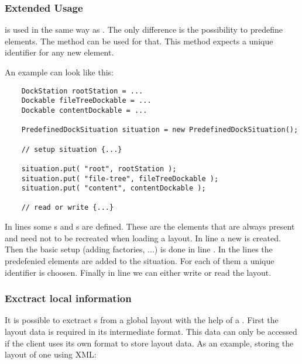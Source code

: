 
\subsubsection{Extended Usage}
 is used in the same way as . The only difference is the possibility to predefine elements. The method  can be used for that. This method expects a unique identifier for any new element.

An example can look like this:
\begin{lstlisting}
	DockStation rootStation = ...
	Dockable fileTreeDockable = ...
	Dockable contentDockable = ...

	PredefinedDockSituation situation = new PredefinedDockSituation();

	// setup situation {...}

	situation.put( "root", rootStation );
	situation.put( "file-tree", fileTreeDockable );
	situation.put( "content", contentDockable );

	// read or write {...}
\end{lstlisting}
In lines  some s and s are defined. These are the elements that are always present and need not to be recreated when loading a layout. In line  a new  is created. Then the basic setup (adding factories, ...) is done in line . In the lines  the predefenied elements are added to the situation. For each of them a unique identifier is choosen. Finally in line  we can either write or read the layout.


\subsubsection{Exctract local information}
It is possible to exctract s from a global layout with the help of a . First the layout data is required in its intermediate format. This data can only be accessed if the client uses its own format to store layout data. As an example, storing the layout of one  using XML:

